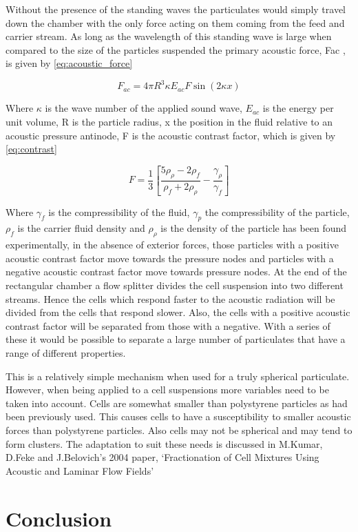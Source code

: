 \documentclass[12pt]{article}
\begin{document}
Without the presence of the standing waves the particulates would simply travel down the chamber with the only force acting on them coming from the feed and carrier stream.
As long as the wavelength of this standing wave is large when compared to the size of the particles suspended the primary acoustic force, Fac , is given by \cref{eq:acoustic_force}


\begin{equation}
F_{ac}=4\pi R^3 \kappa E_{ac} F \sin{(2\kappa x)}
\label{eq:acoustic_force}
\end{equation}

Where $\kappa$ is the wave number of the applied sound wave, $E_{ac}$ is the energy per unit volume, R is the particle radius, x the position in the fluid relative to an acoustic pressure antinode, F is the acoustic contrast factor, which is given by \cref{eq:contrast}

\begin{equation}
F=\frac{1}{3}\left[\frac{5\rho_{\rho} - 2\rho_f}{\rho_f+2\rho_{\rho}}-\frac{\gamma_{\rho}}{\gamma_f}\right]
\label{eq:contrast}
\end{equation}

Where $\gamma_f$ is the compressibility of the fluid, $\gamma_p$ the compressibility of the particle, $\rho_f$ is the carrier fluid density and $\rho_{\rho}$ is the density of the particle  has been found experimentally, in the absence of exterior forces, those particles with a positive acoustic contrast factor move towards the pressure nodes and particles with a negative acoustic contrast factor move towards pressure nodes.
At the end of the rectangular chamber a flow splitter divides the cell suspension into two different streams. Hence the cells which respond faster to the acoustic radiation will be divided from the cells that respond slower. Also, the cells with a positive acoustic contrast factor will be separated from those with a negative. With a series of these it would be possible to separate a large number of particulates that have a range of different properties.

This is a relatively simple mechanism when used for a truly spherical particulate. However, when being applied to a cell suspensions more variables need to be taken into account.  Cells are somewhat smaller than polystyrene particles as had been previously used. This causes cells to have a susceptibility to smaller acoustic forces than polystyrene particles. Also cells may not be spherical and may tend to form clusters. The adaptation to suit these needs is discussed in M.Kumar, D.Feke and J.Belovich’s 2004 paper, ‘Fractionation of Cell Mixtures Using Acoustic and Laminar Flow Fields’ 

\section{Conclusion}


\end{document}
